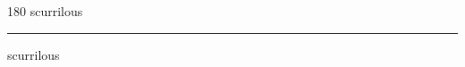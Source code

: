 
\begin{frame}
\begin{center}
\begin{turn}{180}
{\fontsize{2.5cm}{1em}\selectfont scurrilous}
\end{turn}
\vspace{1em}\par  
\hrule
\vspace{1em}\par  
{\fontsize{2.5cm}{1em}\selectfont scurrilous}
\end{center}
\end{frame}
